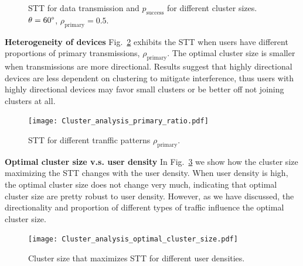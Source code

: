 \documentclass[10pt, conference, letterpaper]{IEEEtran}
\begin{document}
\begin{figure}[htp]
	\centering
	 \hfill
	
	\caption[]{STT for data transmission  and $p_{\mathrm{success}}$  for different cluster sizes. $\theta=60\degree$, $\rho_{\mathrm{primary}} = 0.5$. }
	\label{fig:clusteranalysis:basic}
\end{figure}

\textbf{Heterogeneity of devices} Fig.~\ref{fig:clusteranalysis:primary_ratio} exhibits the STT when users have different proportions of primary transmissions, $\rho_{\mathrm{primary}}$.
The optimal cluster size is smaller when transmissions are more directional. 
Results suggest that highly directional devices are less dependent on clustering to mitigate interference, thus users with highly directional devices may favor small clusters or be better off not joining clusters at all. 


\begin{figure}
	\centering
	\texttt{[image: Cluster\_analysis\_primary\_ratio.pdf]}
	\caption{STT for different tranffic patterns $\rho_{\mathrm{primary}}$.}
	\label{fig:clusteranalysis:primary_ratio}
\end{figure}

\textbf{Optimal cluster size v.s. user density} In Fig.~\ref{fig:clustereanalysis:optimal_cluster_size} we show how the cluster size maximizing the STT changes with the user density. 
When user density is high, the optimal cluster size does not change very much, indicating that optimal cluster size are pretty robust to user density. 
However, as we have discussed, the directionality and proportion of different types of traffic influence the optimal cluster size. 

\begin{figure}
	\centering
	\texttt{[image: Cluster\_analysis\_optimal\_cluster\_size.pdf]}
	\caption{Cluster size that maximizes STT for different user densities.}
	\label{fig:clustereanalysis:optimal_cluster_size}
\end{figure}
\end{document}
